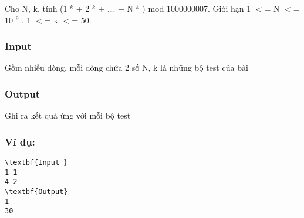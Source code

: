 

Cho N, k, tính (1 $^ k $ + 2 $^ k $ + …. + N $^ k $ ) mod 1000000007. Giới hạn 1 $<$= N $<$= 10 $^ 9 $ , 1 $<$= k $<$= 50.

\subsubsection{Input}

Gồm nhiều dòng, mỗi dòng chứa 2 số N, k là những bộ test của bài

\subsubsection{Output}

Ghi ra kết quả ứng với mỗi bộ test

\subsubsection{Ví dụ:}
\begin{verbatim}
\textbf{Input }
1 1
4 2
\textbf{Output}
1
30


\end{verbatim}